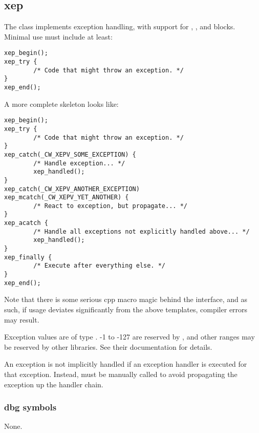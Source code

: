 %
%
%
%
%              

\label{xep}
\subsection{xep}
The  class implements exception handling, with support for
, , and  blocks.
Minimal use must include at least:
\begin{verbatim}
xep_begin();
xep_try {
        /* Code that might throw an exception. */
}
xep_end();
\end{verbatim}

A more complete skeleton looks like:
\begin{verbatim}
xep_begin();
xep_try {
        /* Code that might throw an exception. */
}
xep_catch(_CW_XEPV_SOME_EXCEPTION) {
        /* Handle exception... */
        xep_handled();
}
xep_catch(_CW_XEPV_ANOTHER_EXCEPTION)
xep_mcatch(_CW_XEPV_YET_ANOTHER) {
        /* React to exception, but propagate... */
}
xep_acatch {
        /* Handle all exceptions not explicitly handled above... */
        xep_handled();
}
xep_finally {
        /* Execute after everything else. */
}
xep_end();
\end{verbatim}

Note that there is some serious cpp macro magic behind the 
interface, and as such, if usage deviates significantly from the above
templates, compiler errors may result.

Exception values are of type .  -1 to -127 are reserved by
, and other ranges may be reserved by other libraries.  See
their documentation for details.

An exception is not implicitly handled if an exception handler is executed for
that exception.  Instead,  must be manually called to
avoid propagating the exception up the handler chain.

\subsubsection{dbg symbols}
None.

